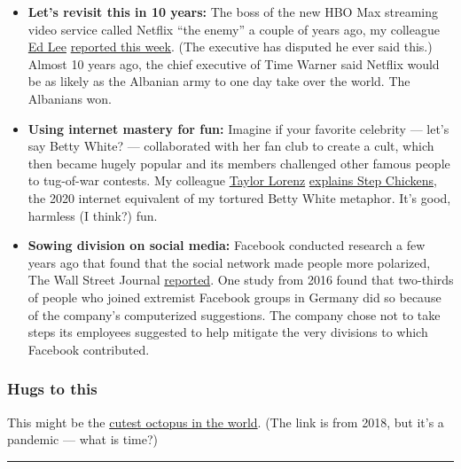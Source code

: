 \begin{itemize}
\item
  \textbf{Let's revisit this in 10 years:} The boss of the new HBO Max
  streaming video service called Netflix ``the enemy'' a couple of years
  ago, my colleague \href{https://www.nytimes.com/by/edmund-lee}{Ed Lee}
  \href{https://www.nytimes.com/2020/05/26/business/media/hbo-max-netflix-streaming.html}{reported
  this week}. (The executive has disputed he ever said this.) Almost 10
  years ago, the chief executive of Time Warner said Netflix would be as
  likely as the Albanian army to one day take over the world. The
  Albanians won.
\item
  \textbf{Using internet mastery for fun:} Imagine if your favorite
  celebrity --- let's say Betty White? --- collaborated with her fan
  club to create a cult, which then became hugely popular and its
  members challenged other famous people to tug-of-war contests. My
  colleague \href{https://www.nytimes.com/by/taylor-lorenz}{Taylor
  Lorenz}
  \href{https://www.nytimes.com/2020/05/26/style/step-chickens-tiktok-cult-wars.html}{explains
  Step Chickens}, the 2020 internet equivalent of my tortured Betty
  White metaphor. It's good, harmless (I think?) fun.
\item
  \textbf{Sowing division on social media:} Facebook conducted research
  a few years ago that found that the social network made people more
  polarized, The Wall Street Journal
  \href{https://www.wsj.com/articles/facebook-knows-it-encourages-division-top-executives-nixed-solutions-11590507499}{reported}.
  One study from 2016 found that two-thirds of people who joined
  extremist Facebook groups in Germany did so because of the company's
  computerized suggestions. The company chose not to take steps its
  employees suggested to help mitigate the very divisions to which
  Facebook contributed.
\end{itemize}

\hypertarget{hugs-to-this}{%
\subsubsection{Hugs to this}\label{hugs-to-this}}

This might be the
\href{https://oceanconservancy.org/blog/2018/10/08/everything-need-know-dumbo-octopus}{cutest
octopus in the world}. (The link is from 2018, but it's a pandemic ---
what is time?)

\begin{center}\rule{0.5\linewidth}{\linethickness}\end{center}

